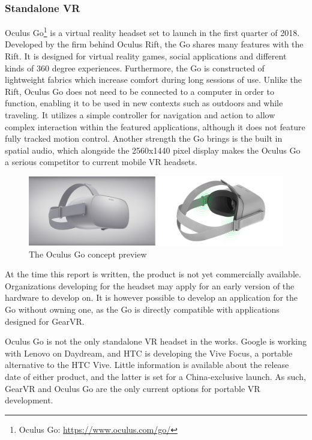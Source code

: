 		
		\subsubsection{Standalone VR}
		Oculus Go\footnote{Oculus Go: \url{https://www.oculus.com/go/}} is a virtual reality headset set to launch in the first quarter of 2018. Developed by the firm behind Oculus Rift, the Go shares many features with the Rift. It is designed for virtual reality games, social applications and different kinds of 360 degree experiences. Furthermore, the Go is constructed of lightweight fabrics which increase comfort during long sessions of use. Unlike the Rift, Oculus Go does not need to be connected to a computer in order to function, enabling it to be used in new contexts such as outdoors and while traveling. It utilizes a simple controller for navigation and action to allow complex interaction within the featured applications, although it does not feature fully tracked motion control. Another strength the Go brings is the built in spatial audio, which alongside the 2560x1440 pixel display makes the Oculus Go a serious competitor to current mobile VR headsets.  \\
		\begin{figure}[H]
			\centering
			\includegraphics[width=1.0\linewidth]{figure/Analysis/oculusgo}
			\caption{The Oculus Go concept preview}
			\label{fig:Oculus}
		\end{figure}
		
		At the time this report is written, the product is not yet commercially available. Organizations developing for the headset may apply for an early version of the hardware to develop on. It is however possible to develop an application for the Go without owning one, as the Go is directly compatible with applications designed for GearVR. 
		
		Oculus Go is not the only standalone VR headset in the works. Google is working with Lenovo on Daydream, and HTC is developing the Vive Focus, a portable alternative to the HTC Vive. Little information is available about the release date of either product, and the latter is set for a China-exclusive launch. As such, GearVR and Oculus Go are the only current options for portable VR development. 
		
